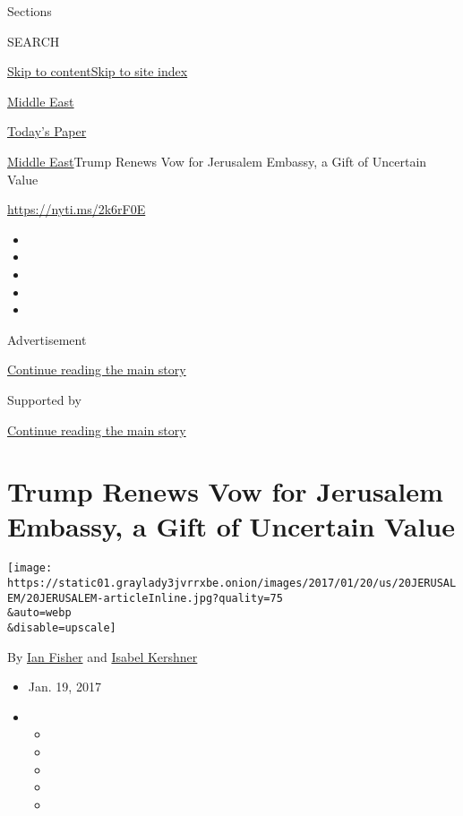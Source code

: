 Sections

SEARCH

\protect\hyperlink{site-content}{Skip to
content}\protect\hyperlink{site-index}{Skip to site index}

\href{https://www.nytimes3xbfgragh.onion/section/world/middleeast}{Middle
East}

\href{https://myaccount.nytimes3xbfgragh.onion/auth/login?response_type=cookie\&client_id=vi}{}

\href{https://www.nytimes3xbfgragh.onion/section/todayspaper}{Today's
Paper}

\href{/section/world/middleeast}{Middle East}\textbar{}Trump Renews Vow
for Jerusalem Embassy, a Gift of Uncertain Value

\url{https://nyti.ms/2k6rF0E}

\begin{itemize}
\item
\item
\item
\item
\item
\end{itemize}

Advertisement

\protect\hyperlink{after-top}{Continue reading the main story}

Supported by

\protect\hyperlink{after-sponsor}{Continue reading the main story}

\hypertarget{trump-renews-vow-for-jerusalem-embassy-a-gift-of-uncertain-value}{%
\section{Trump Renews Vow for Jerusalem Embassy, a Gift of Uncertain
Value}\label{trump-renews-vow-for-jerusalem-embassy-a-gift-of-uncertain-value}}

\texttt{[image: https://static01.graylady3jvrrxbe.onion/images/2017/01/20/us/20JERUSALEM/20JERUSALEM-articleInline.jpg?quality=75\\\&auto=webp\\\&disable=upscale]}

By \href{http://www.nytimes3xbfgragh.onion/by/ian-fisher}{Ian Fisher}
and \href{https://www.nytimes3xbfgragh.onion/by/isabel-kershner}{Isabel
Kershner}

\begin{itemize}
\item
  Jan. 19, 2017
\item
  \begin{itemize}
  \item
  \item
  \item
  \item
  \item
  \end{itemize}
\end{itemize}

